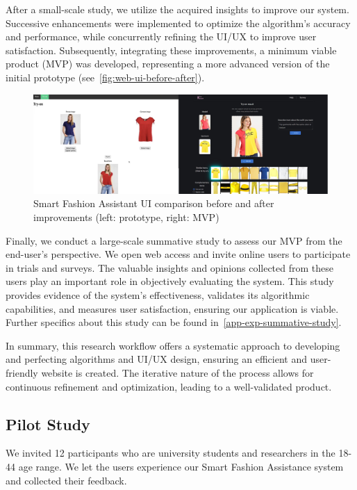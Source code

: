 After a small-scale study, we utilize the acquired insights to improve our system. Successive enhancements were implemented to optimize the algorithm's accuracy and performance, while concurrently refining the UI/UX to improve user satisfaction. Subsequently, integrating these improvements, a minimum viable product (MVP) was developed, representing a more advanced version of the initial prototype (see~\autoref{fig:web-ui-before-after}).

\begin{figure}[h!]
  \centering
  \includegraphics[width=\linewidth]{content/resources/images/application/web-before-after.png}
  \caption{Smart Fashion Assistant UI comparison before and after improvements (left: prototype, right: MVP)}
  \label{fig:web-ui-before-after}
\end{figure}

Finally, we conduct a large-scale summative study to assess our MVP from the end-user's perspective. We open web access and invite online users to participate in trials and surveys. The valuable insights and opinions collected from these users play an important role in objectively evaluating the system. This study provides evidence of the system's effectiveness, validates its algorithmic capabilities, and measures user satisfaction, ensuring our application is viable. Further specifics about this study can be found in~\autoref{app-exp-summative-study}.

In summary, this research workflow offers a systematic approach to developing and perfecting algorithms and UI/UX design, ensuring an efficient and user-friendly website is created. The iterative nature of the process allows for continuous refinement and optimization, leading to a well-validated product.

\subsection{Pilot Study}
\label{app-exp-pilot-study}
We invited 12 participants who are university students and researchers in the 18-44 age range. We let the users experience our Smart Fashion Assistance system and collected their feedback.

